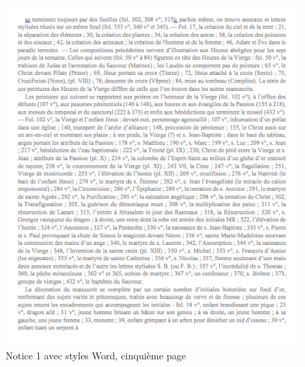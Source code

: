 \documentclass[a4paper,12pt,twoside]{book}
\begin{document}
    \begin{figure}[!h]
    \centering
    \includegraphics[width=15cm]{img/Doc_Sources_transformation/Docs_Word_Styles/Notice1/StylesNotice1_5.png}
    \caption{Notice 1 avec styles Word, cinquième page}
    \end{figure}
    
\end{document}
